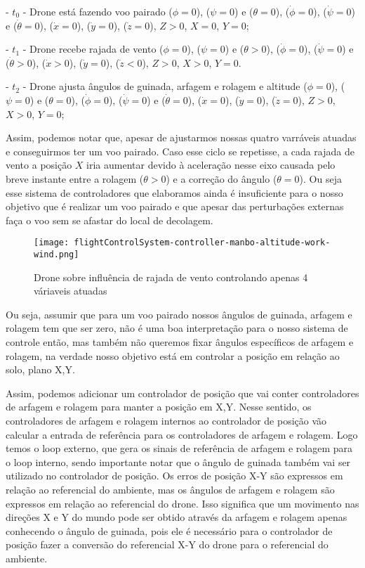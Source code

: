 - \( t_0 \) - Drone está fazendo voo pairado (\(\phi = 0\)), (\(\psi = 0\)) e (\(\theta = 0\)), (\(\dot{\phi} = 0\)), (\(\dot{\psi} = 0\)) e (\(\dot{\theta} = 0\)), (\(\dot{x} = 0\)), (\(\dot{y} = 0\)), (\(\dot{z} = 0\)), \( Z > 0 \), \( X = 0 \), \( Y = 0 \);

- \( t_1 \) - Drone recebe rajada de vento (\(\phi = 0\)), (\(\psi = 0\)) e (\(\theta > 0\)), (\(\dot{\phi} = 0\)), (\(\dot{\psi} = 0\)) e (\(\dot{\theta} > 0\)), (\(\dot{x} > 0\)), (\(\dot{y} = 0\)), (\(\dot{z} < 0\)), \( Z > 0 \), \( X > 0 \), \( Y = 0 \).

- \( t_2 \) - Drone ajusta ângulos de guinada, arfagem e rolagem e altitude (\(\phi = 0\)), (\(\psi = 0\)) e (\(\theta = 0\)), (\(\dot{\phi} = 0\)), (\(\dot{\psi} = 0\)) e (\(\dot{\theta} = 0\)), (\(\dot{x} = 0\)), (\(\dot{y} = 0\)), (\(\dot{z} = 0\)), \( Z > 0 \), \( X > 0 \), \( Y = 0 \);

Assim, podemos notar que, apesar de ajustarmos nossas quatro varráveis atuadas e conseguirmos ter um voo pairado. Caso esse ciclo se repetisse, a cada rajada de vento a posição \( X \) iria aumentar devido à aceleração nesse eixo causada pelo breve instante entre a rolagem (\(\theta > 0\)) e a correção do ângulo (\(\theta = 0\)). Ou seja esse sistema de controladores que elaboramos ainda é insuficiente para o nosso objetivo que é realizar um voo pairado e que apesar das perturbações externas faça o voo sem se afastar do local de decolagem.


\begin{figure}[H]
	\centering
	\texttt{[image: flightControlSystem-controller-manbo-altitude-work-wind.png]}
	\caption{Drone sobre influência de rajada de vento controlando apenas 4 váriaveis atuadas}
	\centering
	\label{Drone sobre influência de rajada de vento controlando apenas 4 váriaveis atuadas}
\end{figure}

Ou seja, assumir que para um voo pairado nossos ângulos de guinada, arfagem e rolagem tem que ser zero, não é uma boa interpretação para o nosso sistema de controle então, mas também não queremos fixar ângulos específicos de arfagem e rolagem, na verdade nosso objetivo está em controlar a posição em relação ao solo, plano X,Y.

Assim, podemos adicionar um controlador de posição que vai conter controladores de arfagem e rolagem para manter a posição em X,Y. Nesse sentido, os controladores de arfagem e rolagem internos ao controlador de posição vão calcular a entrada de referência para os controladores de arfagem e rolagem. Logo temos o loop externo, que gera os sinais de referência de arfagem e rolagem para o loop interno, sendo importante notar que o ângulo de guinada também vai ser utilizado no controlador de posição. Os erros de posição X-Y são expressos em relação ao referencial do ambiente, mas os ângulos de arfagem e rolagem são expressos em relação ao referencial do drone. Isso significa que um movimento nas direções X e Y do mundo pode ser obtido através da arfagem e rolagem apenas conhecendo o ângulo de guinada, pois ele é necessário para o controlador de posição fazer a conversão do referencial X-Y do drone para o referencial do ambiente.
 


